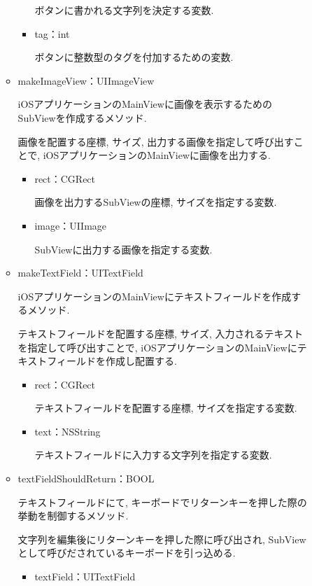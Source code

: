 \begin{description}
\begin{itemize}
\begin{itemize}
\begin{itemize}
ボタンに書かれる文字列を決定する変数.

\item tag：int

ボタンに整数型のタグを付加するための変数.
\end{itemize}

\item makeImageView：UIImageView

iOSアプリケーションのMainViewに画像を表示するためのSubViewを作成するメソッド.

画像を配置する座標, サイズ, 出力する画像を指定して呼び出すことで, iOSアプリケーションのMainViewに画像を出力する.

\begin{itemize}
\item rect：CGRect

画像を出力するSubViewの座標, サイズを指定する変数.

\item image：UIImage

SubViewに出力する画像を指定する変数.
\end{itemize}

\item makeTextField：UITextField

iOSアプリケーションのMainViewにテキストフィールドを作成するメソッド.

テキストフィールドを配置する座標, サイズ, 入力されるテキストを指定して呼び出すことで, iOSアプリケーションのMainViewにテキストフィールドを作成し配置する.

\begin{itemize}
\item rect：CGRect

テキストフィールドを配置する座標, サイズを指定する変数.

\item text：NSString

テキストフィールドに入力する文字列を指定する変数.
\end{itemize}

\item textFieldShouldReturn：BOOL

テキストフィールドにて, キーボードでリターンキーを押した際の挙動を制御するメソッド.

文字列を編集後にリターンキーを押した際に呼び出され, SubViewとして呼びだされているキーボードを引っ込める.

\begin{itemize}
\item textField：UITextField


\end{itemize}
\end{itemize}
\end{itemize}
\end{description}
